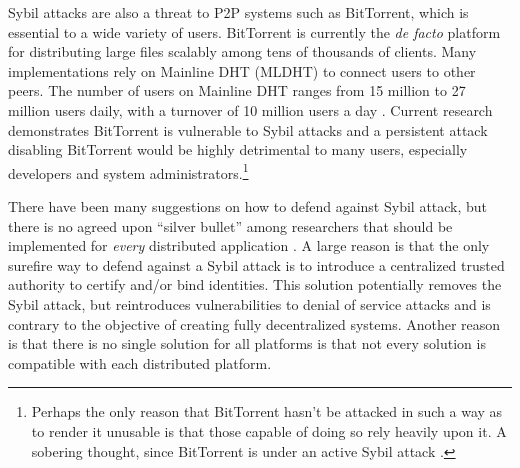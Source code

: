 \documentclass[11pt,conference]{IEEEtran}
\begin{document}
Sybil attacks are also a threat to P2P systems such as BitTorrent, which is essential to a wide variety of users.
BitTorrent is currently the \textit{de facto} platform for distributing large files scalably among tens of thousands of clients.
Many implementations rely on Mainline DHT (MLDHT) \cite{mainline} to connect users to other peers.
The number of users on Mainline DHT ranges from 15 million to 27 million users daily, with a turnover of 10 million users a day \cite{mainlineMeasure}.
Current research demonstrates BitTorrent is vulnerable to Sybil attacks and a persistent attack disabling BitTorrent would be highly detrimental to many users, especially developers and system administrators.\footnote{Perhaps the only reason that BitTorrent hasn't be attacked in such a way as to render it unusable is that those capable of doing so rely heavily upon it.  A sobering thought, since BitTorrent is under an active Sybil attack \cite{sybilbit}. }


There have been many suggestions on how to defend against Sybil attack, but there is no agreed upon ``silver bullet'' among researchers that should be implemented for \textit{every } distributed application \cite{levine2006survey} \cite{dhtsec}.
A large reason is that the only surefire way to defend against a Sybil attack is to introduce a centralized trusted authority to certify and/or bind identities.
This solution potentially removes the Sybil attack, but reintroduces vulnerabilities to denial of service attacks and is contrary to the objective of creating fully decentralized systems.
Another reason is that there is no single solution for all platforms is that not every solution is compatible with each distributed platform.


\end{document}
